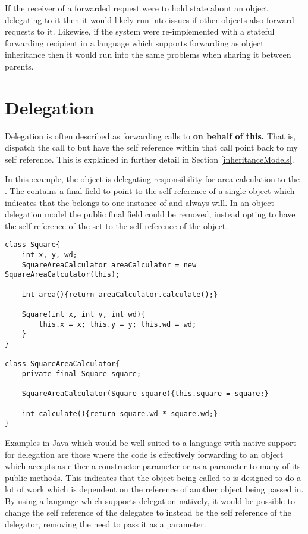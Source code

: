 If the receiver of a forwarded request were to hold state about an object delegating to it then it would likely run into issues if other objects also forward requests to it. Likewise, if the system were re-implemented with a stateful forwarding recipient in a language which supports forwarding as object inheritance then it would run into the same problems when sharing it between parents.

\section{Delegation}
\label{sec:delegation}
Delegation is often described as forwarding  calls to  \textbf{on behalf of this.} That is, dispatch the call to  but have the self reference within that call point back to my self reference. This is explained in further detail in Section \ref{inheritanceModels}.
\newline

In this example, the  object is delegating responsibility for area calculation to the . The  contains a final field to point to the self reference of a single  object which indicates that the  belongs to one instance of  and always will. In an object delegation model the public final field could be removed, instead opting to have the self reference of the  set to the self reference of the  object.
\begin{lstlisting}
class Square{
	int x, y, wd;
	SquareAreaCalculator areaCalculator = new SquareAreaCalculator(this);

	int area(){return areaCalculator.calculate();}

	Square(int x, int y, int wd){
		this.x = x; this.y = y; this.wd = wd;
	}
}

class SquareAreaCalculator{
	private final Square square;

	SquareAreaCalculator(Square square){this.square = square;}

	int calculate(){return square.wd * square.wd;}
}
\end{lstlisting}

Examples in Java which would be well suited to a language with native support for delegation are those where the code is effectively forwarding to an object which accepts  as either a constructor parameter or as a parameter to many of its public methods. This indicates that the object being called to is designed to do a lot of work which is dependent on the  reference of another object being passed in. By using a language which supports delegation natively, it would be possible to change the self reference of the delegatee to instead be the self reference of the delegator, removing the need to pass it as a parameter.


